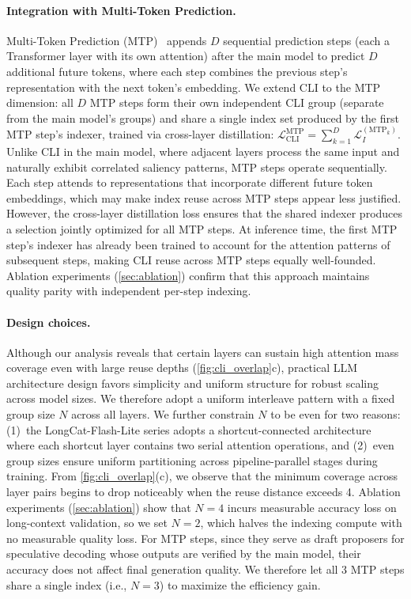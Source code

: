 \documentclass{article}
\newcommand{\longcat}{LongCat-Flash-Lite\xspace}
\begin{document}
\paragraph{Integration with Multi-Token Prediction.}
\label{sec:mtp_integration}
Multi-Token Prediction (MTP)~\citep{liu2024deepseekv3, zeng2026glm5} appends $D$ sequential prediction steps (each a Transformer layer with its own attention) after the main model to predict $D$ additional future tokens, where each step combines the previous step's representation with the next token's embedding. We extend CLI to the MTP dimension: all $D$ MTP steps form their own independent CLI group (separate from the main model's groups) and share a single index set produced by the first MTP step's indexer, trained via cross-layer distillation: $\mathcal{L}_{\text{CLI}}^{\text{MTP}} = \sum_{k=1}^{D} \mathcal{L}_I^{(\mathrm{MTP}_k)}$. Unlike CLI in the main model, where adjacent layers process the same input and naturally exhibit correlated saliency patterns, MTP steps operate sequentially. Each step attends to representations that incorporate different future token embeddings, which may make index reuse across MTP steps appear less justified. However, the cross-layer distillation loss ensures that the shared indexer produces a selection jointly optimized for all MTP steps. At inference time, the first MTP step's indexer has already been trained to account for the attention patterns of subsequent steps, making CLI reuse across MTP steps equally well-founded. Ablation experiments (\cref{sec:ablation}) confirm that this approach maintains quality parity with independent per-step indexing.

\paragraph{Design choices.}
Although our analysis reveals that certain layers can sustain high attention mass coverage even with large reuse depths (\cref{fig:cli_overlap}c), practical LLM architecture design favors simplicity and uniform structure for robust scaling across model sizes. We therefore adopt a uniform interleave pattern with a fixed group size $N$ across all layers. We further constrain $N$ to be even for two reasons: (1)~the \longcat series adopts a shortcut-connected architecture~\citep{cai2024shortcut,team2025longcat} where each shortcut layer contains two serial attention operations, and (2)~even group sizes ensure uniform partitioning across pipeline-parallel stages during training. From \cref{fig:cli_overlap}(c), we observe that the minimum coverage across layer pairs begins to drop noticeably when the reuse distance exceeds 4. Ablation experiments (\cref{sec:ablation}) show that $N = 4$ incurs measurable accuracy loss on long-context validation, so we set $N = 2$, which halves the indexing compute with no measurable quality loss. For MTP steps, since they serve as draft proposers for speculative decoding whose outputs are verified by the main model, their accuracy does not affect final generation quality. We therefore let all 3 MTP steps share a single index (i.e., $N = 3$) to maximize the efficiency gain.
\end{document}
